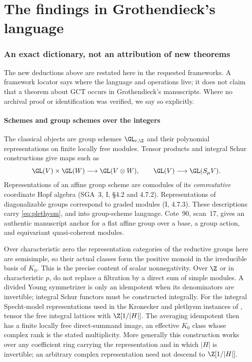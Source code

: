 \part{The findings in Grothendieck's language}
\section{An exact dictionary, not an attribution of new theorems}\label{sec:groth}
The new deductions above are restated here in the requested frameworks. A framework locator says where the language and operations live; it does not claim that a theorem about GCT occurs in Grothendieck's manuscripts. Where no archival proof or identification was verified, we say so explicitly.

\subsection{Schemes and group schemes over the integers}
The classical objects are group schemes $\GL_{r,\Z}$ and their polynomial representations on finite locally free modules. Tensor products and integral Schur constructions give maps such as
\[
 \GL(V)\times\GL(W)\longrightarrow\GL(V\otimes W),\qquad
 \GL(V)\longrightarrow\GL(S_\mu V).
\]
Representations of an affine group scheme are comodules of its \emph{commutative} coordinate Hopf algebra (SGA~3, I, \S4.2 and 4.7.2). Representations of diagonalizable groups correspond to graded modules (I, 4.7.3). These descriptions carry \eqref{eq:plethysm},  and  into group-scheme language. Cote~90, scan~17, gives an authentic manuscript anchor for a flat affine group over a base, a group action, and equivariant quasi-coherent modules.

Over characteristic zero the representation categories of the reductive groups here are semisimple, so their actual classes form the positive monoid in the irreducible basis of $K_0$. This is the precise content of scalar nonnegativity. Over $\Z$ or in characteristic $p$, do not replace a filtration by a direct sum of simple modules. A divided Young symmetrizer is only an idempotent when its denominators are invertible; integral Schur functors must be constructed integrally. For the integral Specht-model representations used in the Kronecker and plethysm instances of , tensor the free integral lattices with $\Z[1/|H|]$. The averaging idempotent then has a finite locally free direct-summand image, an effective $K_0$ class whose complex rank is the stated multiplicity. More generally this construction works over any coefficient ring carrying the representation and in which $|H|$ is invertible; an arbitrary complex representation need not descend to $\Z[1/|H|]$.

